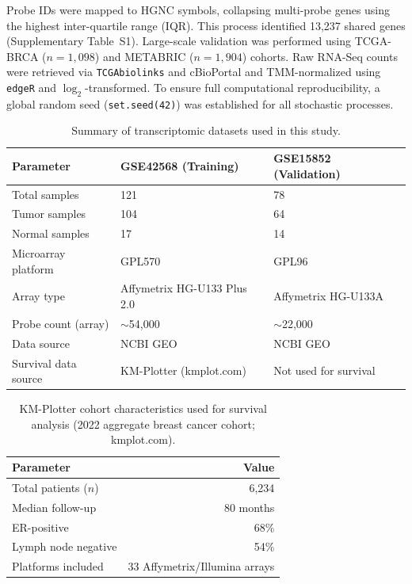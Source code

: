 \documentclass[a4paper,fleqn]{cas-dc}
\begin{document}
Probe IDs were mapped to HGNC symbols, collapsing multi-probe genes using the highest inter-quartile range (IQR). This process identified 13,237 shared genes (Supplementary Table~S1). Large-scale validation was performed using TCGA-BRCA ($n=1{,}098$) and METABRIC ($n=1{,}904$) cohorts. Raw RNA-Seq counts were retrieved via \texttt{TCGAbiolinks} and cBioPortal and TMM-normalized using \texttt{edgeR} and $\log_2$-transformed. To ensure full computational reproducibility, a global random seed (\texttt{set.seed(42)}) was established for all stochastic processes.

\begin{table}[width=\textwidth,cols=3,pos=t]
\caption{Summary of transcriptomic datasets used in this study.}\label{tbl:datasets}
\begin{tabular*}{\tblwidth}{@{}LLL@{}}
\toprule
Parameter & GSE42568 (Training) & GSE15852 (Validation) \\
\midrule
Total samples & 121 & 78 \\
Tumor samples & 104 & 64 \\
Normal samples & 17 & 14 \\
Microarray platform & GPL570 & GPL96 \\
Array type & Affymetrix HG-U133 Plus 2.0 & Affymetrix HG-U133A \\
Probe count (array) & $\sim$54,000 & $\sim$22,000 \\
Data source & NCBI GEO & NCBI GEO \\
Survival data source & KM-Plotter (kmplot.com) & Not used for survival \\
\bottomrule
\end{tabular*}
\end{table}

\begin{table}[width=.95\linewidth,cols=2,pos=t]
\caption{KM-Plotter cohort characteristics used for survival analysis (2022 aggregate breast cancer cohort; kmplot.com).}\label{tbl:kmplot}
\begin{tabular*}{\tblwidth}{@{}LR@{}}
\toprule
Parameter & Value \\
\midrule
Total patients ($n$) & 6,234 \\
Median follow-up & 80 months \\
ER-positive & 68\% \\
Lymph node negative & 54\% \\
Platforms included & 33 Affymetrix/Illumina arrays \\
\bottomrule
\end{tabular*}
\end{table}
\end{document}
